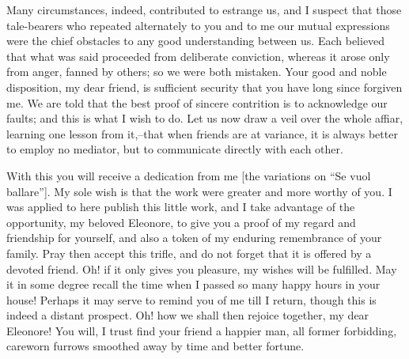 \documentclass[12pt,oneside]{book}
\begin{document}
Many circumstances, indeed, contributed to estrange us, and I suspect that those tale-bearers who repeated alternately to you and to me our mutual expressions were the chief obstacles to any good understanding between us. Each believed that what was said proceeded from deliberate conviction, whereas it arose only from anger, fanned by others; so we were both mistaken. Your good and noble disposition, my dear friend, is sufficient security that you have long since forgiven me. We are told that the best proof of sincere contrition is to acknowledge our faults; and this is what I wish to do. Let us now draw a veil over the whole affiar, learning one lesson from it,--that when friends are at variance, it is always better to employ no mediator, but to communicate directly with each other. \par 

With this you will receive a dedication from me [the variations on ``Se vuol ballare'']. My sole wish is that the work were greater and more worthy of you. I was applied to here publish this little work, and I take advantage of the opportunity, my beloved Eleonore, to give you a proof of my regard and friendship for yourself, and also a token of my enduring remembrance of your family. Pray then accept this trifle, and do not forget that it is offered by a devoted friend. Oh! if it only gives you pleasure, my wishes will be fulfilled. May it in some degree recall the time when I passed so many happy hours in your house! Perhaps it may serve to remind you of me till I return, though this is indeed a distant prospect. Oh! how we shall then rejoice together, my dear Eleonore! You will, I trust find your friend a happier man, all former forbidding, careworn furrows smoothed away by time and better fortune. \par 
\end{document}
